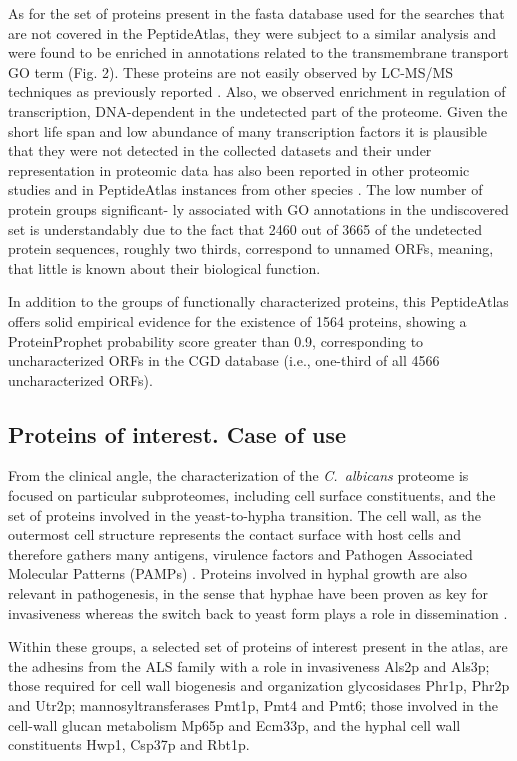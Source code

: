 As for the set of proteins present in the fasta database used
for the searches that are not covered in the PeptideAtlas, they
were subject to a similar analysis and were found to be enriched
in annotations related to the transmembrane transport GO term
(Fig. 2). These proteins are not easily observed by LC-MS/MS
techniques as previously reported \citep{Gunaratne2013b}. Also, we observed
enrichment in regulation of transcription, DNA-dependent in the
undetected part of the proteome. Given the short life span and
low abundance of many transcription factors it is plausible that
they were not detected in the collected datasets and their under
representation in proteomic data has also been reported in other
proteomic studies and in PeptideAtlas instances from other
species \citep{Gunaratne2013b,Ding2013,Simicevic2013}. 
The low number of protein groups significant-
ly associated with GO annotations in the undiscovered set is
understandably due to the fact that 2460 out of 3665 of the
undetected protein sequences, roughly two thirds, correspond to
unnamed ORFs, meaning, that little is known about their
biological function.



In addition to the groups of functionally characterized proteins,
 this PeptideAtlas offers solid empirical evidence for the
existence of 1564 proteins, showing a ProteinProphet probability
score greater than 0.9, corresponding to uncharacterized ORFs in
the CGD database (i.e., one-third of all 4566 uncharacterized ORFs).


\subsection*{Proteins of interest. Case of use}


From the clinical angle, the characterization of the \textit{\mbox{C. albicans}}
proteome is focused on particular subproteomes, including
cell surface constituents, and the set of proteins involved in
the yeast-to-hypha transition. The cell wall, as the outermost
cell structure represents the contact surface with host cells
and therefore gathers many antigens, virulence factors and
Pathogen Associated Molecular Patterns (PAMPs) \citep{Vialas2012}. Proteins
involved in hyphal growth are also relevant in pathogenesis,
in the sense that hyphae have been proven as key for
invasiveness whereas the switch back to yeast form plays a
role in dissemination \citep{Saville2003}.


Within these groups, a selected set of proteins of interest
present in the atlas, are the adhesins from the ALS family with
a role in invasiveness Als2p and Als3p; those required for cell
wall biogenesis and organization glycosidases Phr1p, Phr2p
and Utr2p; mannosyltransferases Pmt1p, Pmt4 and Pmt6;
those involved in the cell-wall glucan metabolism Mp65p and
Ecm33p, and the hyphal cell wall constituents Hwp1, Csp37p
and Rbt1p.

